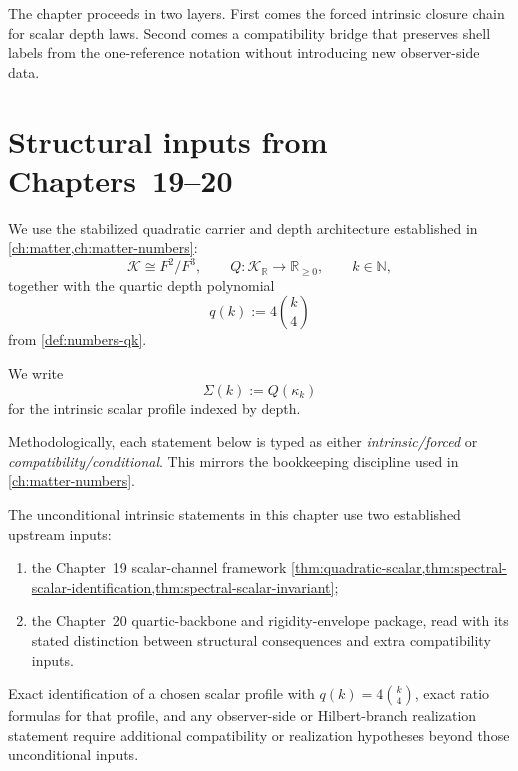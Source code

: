 The chapter proceeds in two layers.
First comes the forced intrinsic closure chain for scalar depth laws.
Second comes a compatibility bridge that preserves shell labels from the
one-reference notation
without introducing new observer-side data.

\section{Structural inputs from Chapters~19--20}
\label{sec:shell-inputs}

We use the stabilized quadratic carrier and depth architecture established in
\cref{ch:matter,ch:matter-numbers}:
\[
  \mathcal K\cong F^2/F^3,
  \qquad
  Q:\mathcal K_{\mathbb R}\to\mathbb R_{\ge0},
  \qquad
  k\in\mathbb N,
\]
together with the quartic depth polynomial
\[
  q(k):=4\binom{k}{4}
\]
from \cref{def:numbers-qk}.

We write
\[
  \Sigma(k):=Q(\kappa_k)
\]
for the intrinsic scalar profile indexed by depth.

Methodologically, each statement below is typed as either
\emph{intrinsic/forced} or \emph{compatibility/conditional}.
This mirrors the bookkeeping discipline used in
\cref{ch:matter-numbers}.

\begin{proposition}
\label{prop:shell-dependency-role}
The unconditional intrinsic statements in this chapter use two established
upstream inputs:
\begin{enumerate}[label=\textup{(\roman*)}]
\item the Chapter~19 scalar-channel framework
      \cref{thm:quadratic-scalar,thm:spectral-scalar-identification,thm:spectral-scalar-invariant};
\item the Chapter~20 quartic-backbone and rigidity-envelope package,
      read with its stated distinction between structural consequences
      and extra compatibility inputs.
\end{enumerate}
Exact identification of a chosen scalar profile with
\(q(k)=4\binom{k}{4}\), exact ratio formulas for that profile, and any
observer-side or Hilbert-branch realization statement require
additional compatibility or realization hypotheses beyond those
unconditional inputs.
\end{proposition}

